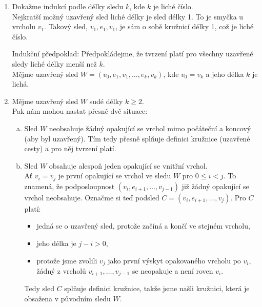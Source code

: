 \documentclass[11pt,a4paper]{article}
\begin{document}
\begin{solution}
\titlebreak
\begin{enumerate}
    \item Dokažme indukcí podle délky sledu $k$, kde $k$ je liché číslo.\\
    Nejkratší možný uzavřený sled liché délky je sled délky 1. To je smyčka u vrcholu $v_1$. Takový sled, 
    $v_1, e_1, v_1$, je sám o sobě kružnicí délky 1, což je liché číslo.

    Indukční předpoklad: Předpokládejme, že tvrzení platí pro všechny uzavřené sledy liché délky menší než $k$.\\
     Mějme uzavřený sled $W = (v_0, e_1, v_1, \dots, e_k, v_k)$, kde $v_0 = v_k$ a jeho délka
    $k$ je lichá.
    \item Mějme uzavřený sled $W$ sudé délky $k \geq 2$.\\
    Pak nám mohou nastat přesně dvě situace:
    \begin{enumerate}[(a)]
        \item Sled $W$ neobsahuje žádný opakující se vrchol mimo počáteční a koncový (aby byl uzavřený). Tím tedy přesně
        splňuje definici kružnice (uzavřené cesty) a pro něj tvrzení platí.
        \item Sled $W$ obsahuje alespoň jeden opakující se vnitřní vrchol.\\
        Ať $v_i = v_j$ je první opakující se vrchol ve sledu $W$ pro $0 \leq i < j$. To znamená, že podposloupnost
        $(v_i, e_{i+1}, \dots, v_{j-1})$ již žádný opakující se vrchol neobsahuje. Označme si teď podsled
        $C=(v_i, e_{i+1}, \dots, v_j)$. Pro $C$ platí:
        \begin{itemize}
            \item jedná se o uzavřený sled, protože začíná a končí ve stejném vrcholu,
            \item jeho délka je $j-i > 0$,
            \item protože jsme zvolili $v_j$ jako první výskyt opakovaného vrcholu po $v_i$, žádný z vrcholů
            $v_{i+1}, \dots, v_{j-1}$ se neopakuje a není roven $v_i$.
        \end{itemize}
        Tedy sled $C$ splňuje definici kružnice, takže jsme našli kružnici, která je obsažena v původním sledu $W$.
    \end{enumerate}
\end{enumerate}
\end{solution}
\end{document}
